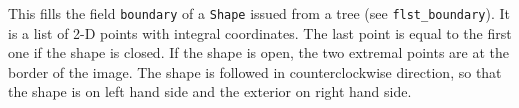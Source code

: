 This fills the field \texttt{boundary} of a \texttt{Shape} issued from a tree
(see \texttt{flst\_boundary}). It is a list of 2-D points with integral
coordinates. The last point is equal to the first one if the shape is
closed. If the shape is open, the two extremal points are at the border of the
image. The shape is followed in counterclockwise direction, so that the shape
is on left hand side and the exterior on right hand side.
